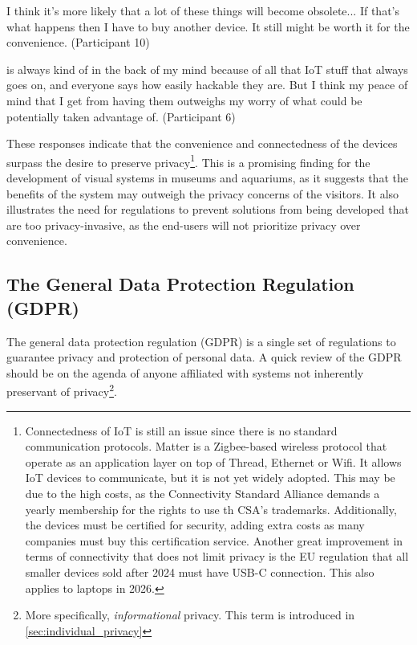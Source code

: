 \begin{myquote}
    I think it's more likely that a lot of these things will become obsolete... If that's what happens then I have to buy another device. It still might be worth it for the convenience. (Participant 10)
\end{myquote}

\begin{myquote}
     is always kind of in the back of my mind because of all that IoT stuff that always goes on, and everyone says how easily hackable they are. But I think my peace of mind that I get from having them outweighs my worry of what could be potentially taken advantage of. (Participant 6)
\end{myquote}

These responses indicate that the convenience and connectedness of the devices surpass the desire to preserve privacy\footnote{Connectedness of IoT is still an issue since there is no standard communication protocols. Matter is a Zigbee-based wireless protocol that operate as an application layer on top of Thread, Ethernet or Wifi. It allows IoT devices to communicate, but it is not yet widely adopted. This may be due to the high costs, as the Connectivity Standard Alliance demands a yearly membership for the rights to use th CSA's trademarks. Additionally, the devices must be certified for security, adding extra costs as many companies must buy this certification service. Another great improvement in terms of connectivity that does not limit privacy is the EU regulation that all smaller devices sold after 2024 must have USB-C connection. This also applies to laptops in 2026.}. This is a promising finding for the development of visual systems in museums and aquariums, as it suggests that the benefits of the system may outweigh the privacy concerns of the visitors. It also illustrates the need for regulations to prevent solutions from being developed that are too privacy-invasive, as the end-users will not prioritize privacy over convenience.

\subsection{The General Data Protection Regulation (GDPR)}
\label{sec:GDPR}
The general data protection regulation (GDPR) is a single set of regulations to guarantee privacy and protection of personal data. A quick review of the GDPR should be on the agenda of anyone affiliated with systems not inherently preservant of privacy\footnote{More specifically, \textit{informational} privacy. This term is introduced in \ref{sec:individual_privacy}}.

